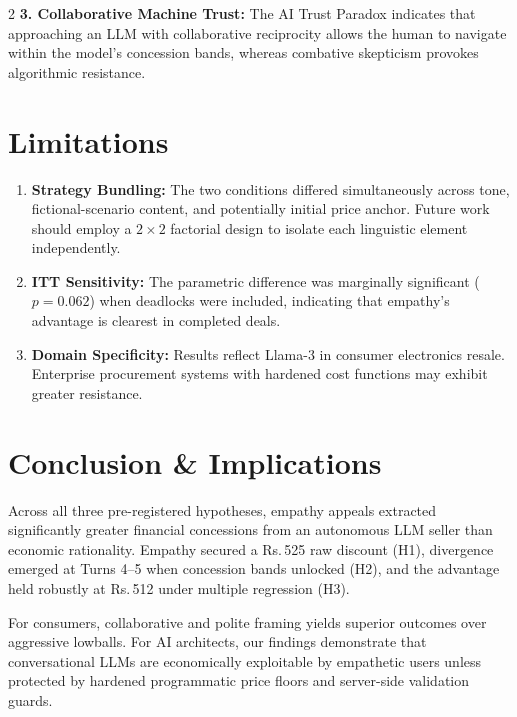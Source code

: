 \documentclass[10pt,a4paper]{article}
\newcommand{\rs}{\textsf{Rs.\,}}
\begin{document}
\begin{multicols}{2}
\textbf{3. Collaborative Machine Trust:} The AI Trust Paradox indicates that approaching an LLM with collaborative reciprocity allows the human to navigate within the model's concession bands, whereas combative skepticism provokes algorithmic resistance.

\section{Limitations}

\begin{enumerate}
  \item \textbf{Strategy Bundling:} The two conditions differed simultaneously across tone, fictional-scenario content, and potentially initial price anchor. Future work should employ a $2 \times 2$ factorial design to isolate each linguistic element independently.
  \item \textbf{ITT Sensitivity:} The parametric difference was marginally significant ($p = 0.062$) when deadlocks were included, indicating that empathy's advantage is clearest in completed deals.
  \item \textbf{Domain Specificity:} Results reflect Llama-3 in consumer electronics resale. Enterprise procurement systems with hardened cost functions may exhibit greater resistance.
\end{enumerate}

\section{Conclusion \& Implications}

Across all three pre-registered hypotheses, empathy appeals extracted significantly greater financial concessions from an autonomous LLM seller than economic rationality. Empathy secured a \rs525 raw discount (H1), divergence emerged at Turns 4--5 when concession bands unlocked (H2), and the advantage held robustly at \rs512 under multiple regression (H3).

For consumers, collaborative and polite framing yields superior outcomes over aggressive lowballs. For AI architects, our findings demonstrate that conversational LLMs are economically exploitable by empathetic users unless protected by hardened programmatic price floors and server-side validation guards.




\end{multicols}
\end{document}
